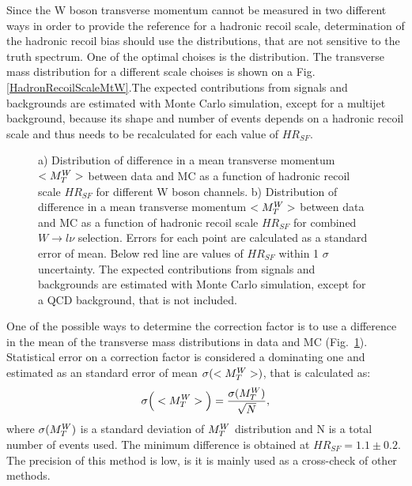 Since the W boson transverse momentum cannot be measured in two different ways in order to provide the reference for a hadronic recoil scale, determination of the hadronic recoil bias should use the distributions, that  are not sensitive to the truth \ptw spectrum.  One of the optimal choises is the \mtw distribution. The transverse mass distribution for a different scale choises is shown on a Fig. \ref{HadronRecoilScaleMtW}.The expected contributions from signals and backgrounds are estimated with Monte Carlo simulation, except for a multijet background, because its shape and number of events depends on a hadronic recoil scale and thus needs to be recalculated for each value of $HR_{SF}$. 

\begin{figure}[!tbp]
\begin{minipage}[h]{0.49\linewidth}
\end{minipage}
\hfill
\begin{minipage}[h]{0.49\linewidth}
\end{minipage}
\caption{a) Distribution of difference in a mean transverse momentum $<M_T^W>$ between data and MC as a function of hadronic recoil scale $HR_{SF}$ for different W boson channels. 
b) Distribution of difference in a mean transverse momentum $<M_T^W>$ between data and MC as a function of hadronic recoil scale $HR_{SF}$ for combined $W \to l \nu$ selection. Errors for each point are calculated as a standard error of mean. Below red line are values of  $HR_{SF}$ within 1 $\sigma$ uncertainty. The expected contributions from signals and backgrounds are estimated with Monte Carlo simulation, except for a QCD background, that is not included.}
\label{fig:HRBiasMean}
\end{figure}

One of the possible ways to determine the correction factor is to use a difference in the mean of the transverse mass distributions in data and MC (Fig.~\ref{fig:HRBiasMean}). Statistical error on a correction factor is considered a dominating one and estimated as an standard error of mean $\sigma ( <M_T^W> ) $, that is calculated as:
\begin{equation}
\sigma \Big( <M_T^W> \Big) = \frac{\sigma( M_T^W )}{\sqrt N},
\end{equation}
where $\sigma(M_T^W)$ is a standard deviation of $M_T^W$ distribution and N is a total number of events used. The minimum difference is obtained at $HR_{SF}=1.1\pm0.2$. The precision of this method is low, is it is mainly used as a cross-check of other methods. 

